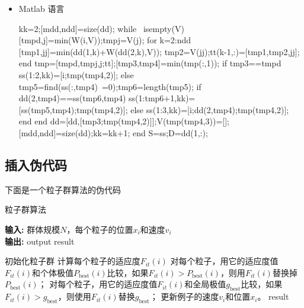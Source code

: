 \begin{itemize}
\item Matlab 语言
\begin{Matlab} 
    kk=2;[mdd,ndd]=size(dd);
    while ~isempty(V)
        [tmpd,j]=min(W(i,V));tmpj=V(j);
        for k=2:ndd
            [tmp1,jj]=min(dd(1,k)+W(dd(2,k),V));
            tmp2=V(jj);tt(k-1,:)=[tmp1,tmp2,jj];
        end
        tmp=[tmpd,tmpj,j;tt];[tmp3,tmp4]=min(tmp(:,1));
        if tmp3==tmpd
            ss(1:2,kk)=[i;tmp(tmp4,2)];
        else
            tmp5=find(ss(:,tmp4)~=0);tmp6=length(tmp5);
            if dd(2,tmp4)==ss(tmp6,tmp4)
                ss(1:tmp6+1,kk)=[ss(tmp5,tmp4);tmp(tmp4,2)];
            else
                ss(1:3,kk)=[i;dd(2,tmp4);tmp(tmp4,2)];
            end
        end
        dd=[dd,[tmp3;tmp(tmp4,2)]];V(tmp(tmp4,3))=[];
        [mdd,ndd]=size(dd);kk=kk+1;
    end
    S=ss;D=dd(1,:);
    \end{Matlab}
\end{itemize}

\subsection{插入伪代码}

下面是一个粒子群算法的伪代码
\begin{center}
    \begin{minipage}{0.8\textwidth}
        \begin{algorithm}[H]%
            \caption{粒子群算法} %
            {\bf 输入:} %
            群体规模$N$，每个粒子的位置$x_{i}$和速度$v_{i}$\\
            {\bf 输出:} %
            output result
        \begin{algorithmic}[1]
            \State 初始化粒子群 %
                \State 计算每个粒子的适应度$F_{it}(i)$
                \State 对每个粒子，用它的适应度值$F_{it}(i)$和个体极值$P_{\text{best}}(i)$比较，如果$F_{it}(i)>P_{\text{best}}(i)$，则用$F_{it}(i)$替换掉$P_{\text{best}}(i)$；
                \State 对每个粒子，用它的适应度值$F_{it}(i)$和全局极值$g_{\text{best}}$比较，如果$F_{it}(i)>g_{\text{best}}$，则使用$F_{it}(i)$替换$g_{\text{best}}$；
                \State 更新例子的速度$v_{i}$和位置$x_{i}$。
            \EndWhile
            \State \Return result
            \end{algorithmic}
        \end{algorithm}
    \end{minipage}
    \label{algo:pso_algoritm}
\end{center}
